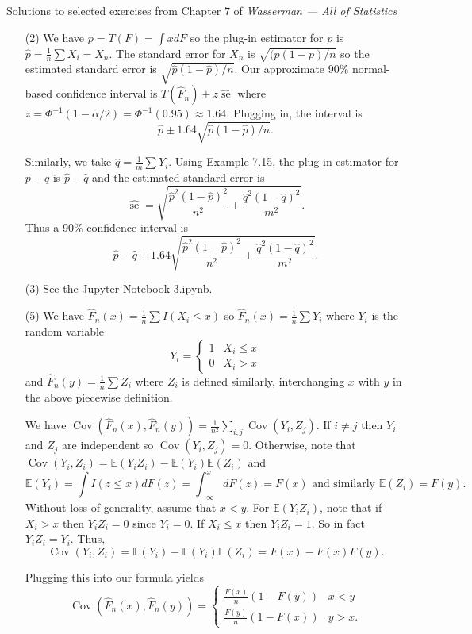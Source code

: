 \documentclass[10pt]{article}
\newcommand{\E}{\mathbb{E}}
\newcommand{\se}{\operatorname{se}}
\newcommand{\Cov}{\operatorname{Cov}}
\begin{document}
\noindent \large{Solutions to selected exercises from Chapter 7 of
\emph{Wasserman --- All of Statistics}}

\begin{enumerate}[(1)]
\item[(2)]
We have $p=T(F)=\int xdF$ so the plug-in estimator for $p$ is
$\hat{p}=\frac{1}{n}\sum X_i = \overline{X_n}$. The standard error for
$\overline{X_n}$ is $\sqrt{(p(1-p)/n}$ so the estimated standard error is
$\sqrt{\hat p(1-\hat p)/n}$. Our approximate 90\% normal-based
confidence interval is $T(\widehat F_n) \pm z \widehat{\se}$ where
$z=\Phi^{-1}(1-\alpha/2)=\Phi^{-1}(0.95) \approx 1.64$. Plugging in,
the interval is
\[
\hat p \pm 1.64 \sqrt{\hat p(1-\hat p)/n}.
\]

Similarly, we take $\hat q = \frac{1}{m}\sum Y_i$. Using Example 7.15, the plug-in
estimator for $p-q$ is $\hat p - \hat q$ and the estimated standard error is
\[
\widehat{\se} =
\sqrt{\frac{\hat p^2(1-\hat p)^2}{n^2} + \frac{\hat q^2(1-\hat q)^2}{m^2}}.
\]
Thus a 90\% confidence interval is
\[
\hat p - \hat q \pm
1.64\sqrt{\frac{\hat p^2(1-\hat p)^2}{n^2} + \frac{\hat q^2(1-\hat q)^2}{m^2}}.
\]

\item[(3)]
See the Jupyter Notebook
\href{https://github.com/ajrasmus/some_of_statistics/blob/main/chapter_7/3.ipynb}{3.ipynb}.

\item[(5)]
We have $\hat F_n(x) = \frac{1}{n} \sum I(X_i \leq x)$ so $\hat F_n(x) =
\frac{1}{n} \sum Y_i$ where $Y_i$ is the random variable
\[
Y_i = \begin{cases}
1 & X_i \leq x \\
0 & X_i > x
\end{cases}
\]
and $\hat F_n(y)=\frac{1}{n} \sum Z_i$ where $Z_i$ is defined similarly,
interchanging $x$ with $y$ in the above piecewise definition.

We have $\Cov(\hat F_n(x), \hat F_n(y))=\frac{1}{n^2} \sum_{i,j} \Cov(Y_i, Z_j)$.
If $i\neq j$ then $Y_i$ and $Z_j$ are
independent so $\Cov(Y_i,Z_j)=0$. Otherwise, note
that $\Cov(Y_i,Z_i) = \E(Y_i Z_i) - \E(Y_i)\E(Z_i)$ and
\[
\E(Y_i) = \int I(z\leq x) dF(z) = \int_{-\infty}^x dF(z) = F(x)
\text{ and similarly }
\E(Z_i) = F(y).
\]
Without loss of generality, assume that $x<y$.
For $\E(Y_iZ_i)$, note that if $X_i>x$ then $Y_iZ_i=0$ since $Y_i=0$.
If $X_i\leq x$ then $Y_iZ_i=1$. So in fact $Y_iZ_i=Y_i$.
Thus,
\[
\Cov(Y_i,Z_i) = \E(Y_i) - \E(Y_i)\E(Z_i) = F(x) - F(x)F(y).
\]

Plugging this into our formula yields
\[
\Cov(\hat F_n(x), \hat F_n(y)) =
\begin{cases}
\frac{F(x)}{n}(1- F(y)) & x < y \\
\frac{F(y)}{n}(1-F(x)) & y > x.
\end{cases}
\]


\end{enumerate}
\end{document}
